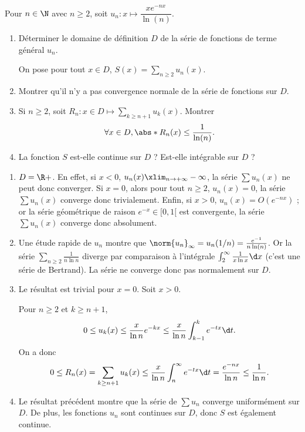 \begin{enonce}
\begin{exercise}[ID={RMS121/2 E1091 CCP},subtitle={},tags={}]
Pour $n\in\N$ avec $n\geq2$, soit $u_n:x\mapsto \dfrac{xe^{-nx}}{\ln(n)}$.
\begin{enumerate}
\item Déterminer le domaine de définition $D$ de la série de fonctions de terme général $u_n$. 
    
On pose pour tout $x\in D$, $S(x)=\sum_{n\geq2} u_n(x)$.
\item Montrer qu'il n'y a pas convergence normale de la série de fonctions sur $D$.
\item Si $n\geq2$, soit $R_n:x\in D\mapsto\sum_{k\geq n+1} u_k(x)$. Montrer
\begin{equation*}
\forall x\in D, \abs*{R_n(x)}\leq\frac{1}{\ln(n)}.
\end{equation*}
\item
La fonction $S$ est-elle continue sur $D$ ? Est-elle intégrable sur $D$ ?
\end{enumerate}
\end{exercise}
\begin{solution}
\begin{enumerate}
\item $D=\R+$. En effet, si $x<0$, $u_n(x)\xlim_{n\to+\infty} -\infty$, la série $\sum u_n(x)$ ne peut donc converger. Si $x=0$, alors pour tout $n\geq 2$, $u_n(x)=0$, la série $\sum u_n(x)$ converge donc trivialement. Enfin, si $x>0$, $u_n(x) = O(e^{-nx})$ ; or la série géométrique de raison $e^{-x}\in[0,1[$ est convergente, la série $\sum u_n(x)$ converge donc absolument.
\item Une étude rapide de $u_n$ montre que $\norm{u_n}_\infty=u_n(1/n)=\frac{e^{-1}}{n\ln (n)}$. Or la série $\sum_{n\geq2} \frac1{n\ln n}$ diverge par comparaison à l'intégrale $\int_2^\infty \frac1{x\ln x}\d x$ (c'est une série de Bertrand).
La série ne converge donc pas normalement sur $D$.
\item Le résultat est trivial pour $x=0$. Soit $x>0$.
    
Pour $n\geq 2$ et $k\ge n+1$,
\begin{equation*}
0\le u_k(x) \le \frac{x}{\ln n} e^{-kx}\le \frac{x}{\ln n}\int_{k-1}^k e^{-tx}\d t.
\end{equation*}
On a donc
\begin{equation*}
0\le R_n(x) = \sum_{k\ge n+1} u_k(x)\le \frac{x}{\ln n}\int_{n}^\infty e^{-tx}\d t = \frac{e^{-nx}}{\ln n}\le \frac1{\ln n}.
\end{equation*}
\item
Le résultat précédent montre que la série de $\sum u_n$ converge uniformément sur $D$.
De plus, les fonctions $u_n$ sont continues sur $D$, donc $S$ est également continue.


\end{enumerate}
\end{solution}
\end{enonce}

